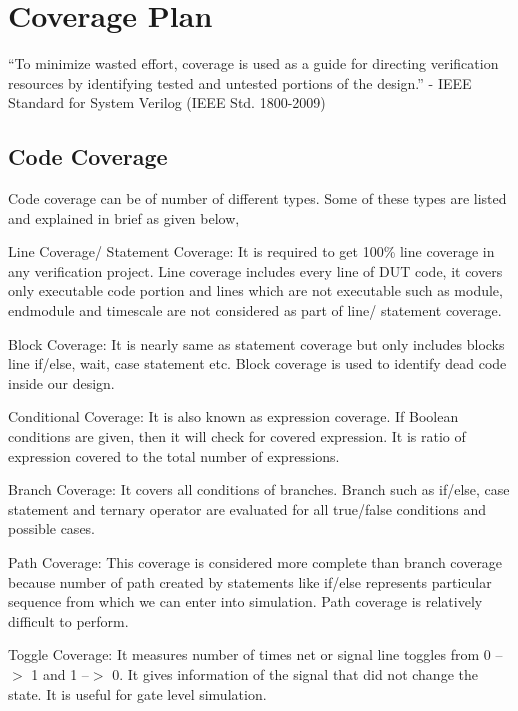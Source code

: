 \section{Coverage Plan}

“To minimize wasted effort, coverage is used as a guide for directing verification resources by identifying tested and untested portions of the design.” - IEEE Standard for System Verilog (IEEE Std. 1800-2009)

\subsection{Code Coverage}

Code coverage can be of number of different types. Some of these types are listed and explained in brief as given below, \par

Line Coverage/ Statement Coverage: It is required to get 100\% line coverage in any verification project. Line coverage includes every line of DUT code, it covers only executable code portion and lines which are not executable such as module, endmodule and timescale are not considered as part of line/ statement coverage. \par

Block Coverage: It is nearly same as statement coverage but only includes blocks line if/else, wait, case statement etc. Block coverage is used to identify dead code inside our design. \par

Conditional Coverage: It is also known as expression coverage. If Boolean conditions are given, then it will check for covered expression. It is ratio of expression covered to the total number of expressions. \par

Branch Coverage: It covers all conditions of branches. Branch such as if/else, case statement and ternary operator are evaluated for all true/false conditions and possible cases. \par

Path Coverage: This coverage is considered more complete than branch coverage because number of path created by statements like if/else represents particular sequence from which we can enter into simulation. Path coverage is relatively difficult to perform. \par

Toggle Coverage: It measures number of times net or signal line toggles from 0 --$>$ 1 and 1 --$>$ 0. It gives information of the signal that did not change the state. It is useful for gate level simulation. \par

